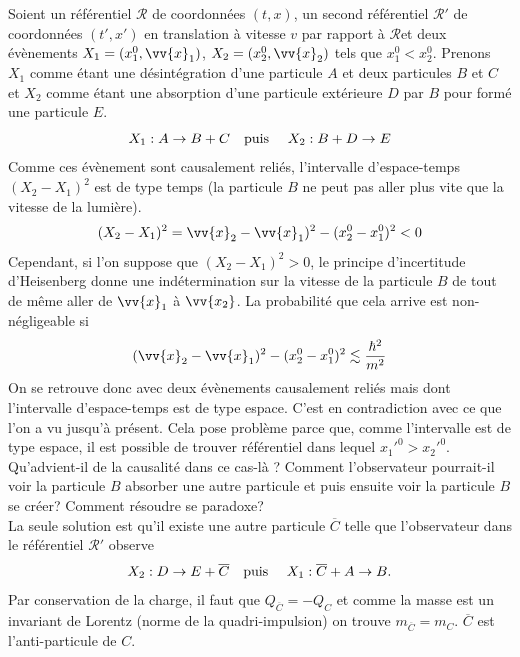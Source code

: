 \documentclass[a4paper,11pt]{report}
\theoremstyle{definition}
\theoremstyle{plain}
\theoremstyle{definition}
\theoremstyle{remark}
\newcommand{\R}{\mathcal{R}}
\begin{document}
            Soient un référentiel $\R$ de coordonnées $(t,x)$, un second référentiel $\R'$ de coordonnées $(t',x')$ en translation à vitesse $v$ par rapport à $\R$et deux évènements $X_1 = (x_1^0,\vv{x}_1)$, $X_2 = (x_2^0,\vv{x}_2)$ tels que $x_1^0<x_2^0$. Prenons $X_1$ comme étant une désintégration d'une particule $A$ et deux particules $B$ et $C$ et $X_2$ comme étant une absorption d'une particule extérieure $D$ par $B$ pour formé une particule $E$.
            \begin{equation}
                X_1 : A\to B+C \text{\quad puis \quad} X_2 : B+D\to E
            \end{equation}
            Comme ces évènement sont causalement reliés, l'intervalle d'espace-temps $(X_2-X_1)^2$ est de type temps (la particule $B$ ne peut pas aller plus vite que la vitesse de la lumière).
            \begin{equation}
                (X_2-X_1)^2 = \vv{x}_2-\vv{x}_1)^2 - (x_2^0-x_1^0)^2 < 0
            \end{equation}
            Cependant, si l'on suppose que $(X_2-X_1)^2 > 0$, le principe d'incertitude d'Heisenberg donne une indétermination sur la vitesse de la particule $B$ de tout de même aller de $\vv{x}_1$ à $\vv{x_2}$. La probabilité que cela arrive est non-négligeable si
            \begin{equation}
                (\vv{x}_2-\vv{x}_1)^2 - (x_2^0-x_1^0)^2 \lesssim \frac{\hbar^2}{m^2}
            \end{equation}
            On se retrouve donc avec deux évènements causalement reliés mais dont l'intervalle d'espace-temps est de type espace. C'est en contradiction avec ce que l'on a vu jusqu'à présent. Cela pose problème parce que, comme l'intervalle est de type espace, il est possible de trouver référentiel dans lequel $x_1'^0 > x_2'^0$. Qu'advient-il de la causalité dans ce cas-là ? Comment l'observateur pourrait-il voir la particule $B$ absorber une autre particule et puis ensuite voir la particule $B$ se créer? Comment résoudre se paradoxe?\\
            
            La seule solution est qu'il existe une autre particule $\overline{C}$ telle que l'observateur dans le référentiel $\R'$ observe
            \begin{equation}
                X_2 : D\to E+\overline{C} \text{\quad puis \quad} X_1 : \overline{C}+A\to B.
            \end{equation}
            Par conservation de la charge, il faut que $Q_{\overline{C}} = -Q_C$ et comme la masse est un invariant de Lorentz (norme de la quadri-impulsion) on trouve $m_{\overline{C}} = m_C$. $\overline{C}$ est l'anti-particule de $C$.\\
            
\end{document}
